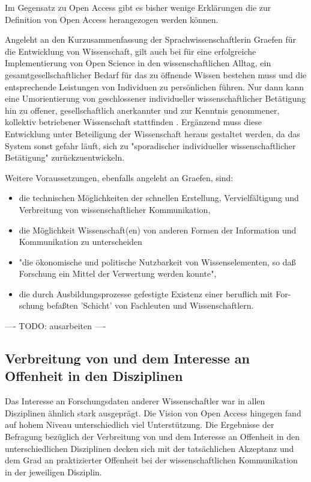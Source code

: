 Im Gegensatz zu Open Access gibt es bisher wenige Erklärungen die zur Definition von Open Access herangezogen werden können.

Angeleht an den Kurzusammenfassung der Sprachwissenschaftlerin Graefen für die Entwicklung von Wissenschaft, gilt auch bei für eine erfolgreiche Implementierung von Open Science in den wissenschaftlichen Alltag, ein gesamtgesellschaftlicher Bedarf für das zu öffnende Wissen bestehen muss und die entsprechende Leistungen von Individuen zu persönlichen führen. Nur dann kann eine Umorientierung von geschlossener individueller wissenschaftlicher Betätigung hin zu offener, gesellschaftlich anerkannter und zur Kenntnis genommener, kollektiv betriebener Wissenschaft stattfinden \cite{graefen2007_wissenschaftliche_artikel}. Ergänzend muss diese Entwicklung unter Beteiligung der Wissenschaft heraus gestaltet werden, da das System sonst gefahr läuft, sich zu "sporadischer individueller wissenschaftlicher Betätigung"\cite{graefen2007_wissenschaftliche_artikel} zurückzuentwickeln.

Weitere Voraussetzungen, ebenfalls angeleht an Graefen, sind:
\begin{itemize}
\item die technischen Möglichkeiten der schnellen Erstellung, Vervielfältigung und Verbreitung von wissenschaftlicher Kommunikation,
\item die Möglichkeit Wissenschaft(en) von anderen Formen der Information und Kommunikation zu unterscheiden
\item "die ökonomische und politische Nutzbarkeit von Wissenselementen, so daß
Forschung ein Mittel der Verwertung werden konnte",
\item die durch Ausbildungsprozesse gefestigte Existenz einer beruflich mit For-
schung befaßten 'Schicht' von Fachleuten und Wissenschaftlern.
\end{itemize}

---- TODO: ausarbeiten ----

\subsection{Verbreitung von und dem Interesse an Offenheit in den Disziplinen}

Das Interesse an Forschungsdaten anderer Wissenschaftler war in allen Disziplinen ähnlich stark ausgeprägt. Die Vision von Open Access hingegen fand auf hohem Niveau unterschiedlich viel Unterstützung. Die Ergebnisse der Befragung bezüglich der Verbreitung von und dem Interesse an Offenheit in den unterschiedlichen Disziplinen decken sich mit der tatsächlichen Akzeptanz und dem Grad an praktizierter Offenheit bei der wissenschaftlichen Kommunikation in der jeweiligen Disziplin.

